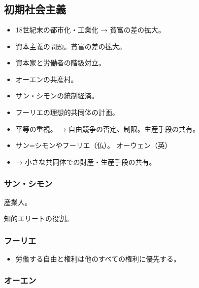 \documentclass[uplatex,dvipdfmx]{jsarticle} \usepackage{mystyle}%
\title{}
\begin{document}
\maketitle
\else\chapter{}\fi






\section{初期社会主義}


\begin{itemize}

\item 18世紀末の都市化・工業化 → 貧富の差の拡大。
\item 資本主義の問題。貧富の差の拡大。
\item 資本家と労働者の階級対立。
\item オーエンの共産村。
\item サン・シモンの統制経済。
\item フーリエの理想的共同体の計画。
\item 平等の重視。 → 自由競争の否定、制限。生産手段の共有。
\item サン=シモンやフーリエ（仏）。 オーウェン（英）
\item → 小さな共同体での財産・生産手段の共有。

\end{itemize}


\subsection{サン・シモン}

産業人。

知的エリートの役割。



\subsection{フーリエ}

\begin{itemize}
\item 労働する自由と権利は他のすべての権利に優先する。
\end{itemize}




\subsection{オーエン}
\end{document}
